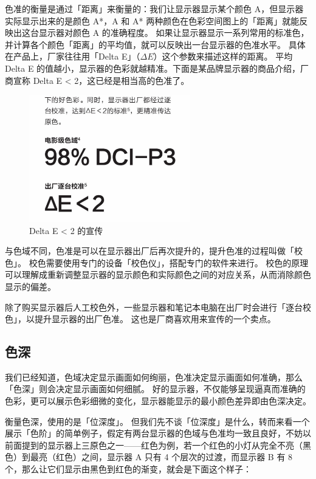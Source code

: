 色准的衡量是通过「距离」来衡量的：我们让显示器显示某个颜色 A，但显示器实际显示出来的是颜色 A*，A 和 A* 两种颜色在色彩空间图上的「距离」就能反映出这台显示器对颜色 A 的准确程度。
如果让显示器显示一系列常用的标准色，并计算各个颜色「距离」的平均值，就可以反映出一台显示器的色准水平。
具体在产品上，厂家往往用「Delta E」（$\Delta E$）这个参数来描述这样的距离。
平均 Delta E 的值越小，显示器的色彩就越精准。下面是某品牌显示器的商品介绍，厂商宣称 Delta E < 2，这已经是相当高的色准了。

\begin{figure}[htb!]
  \centering
  \includegraphics[width=7cm]{assets/Delta_E_below_2.jpg}
  \caption{Delta E < 2 的宣传}
  \label{Delta_E_below_2}
\end{figure}

与色域不同，色准是可以在显示器出厂后再次提升的，提升色准的过程叫做「校色」。
校色需要使用专门的设备「校色仪」，搭配专门的软件来进行。
校色的原理可以理解成重新调整显示器的显示颜色和实际颜色之间的对应关系，从而消除颜色显示的偏差。

除了购买显示器后人工校色外，一些显示器和笔记本电脑在出厂时会进行「逐台校色」，以提升显示器的出厂色准。
这也是厂商喜欢用来宣传的一个卖点。

\subsection{色深}

我们已经知道，色域决定显示画面如何绚丽，色准决定显示画面如何准确，那么「色深」则会决定显示画面如何细腻。
好的显示器，不仅能够呈现逼真而准确的色彩，更可以展示色彩细微的变化，显示器能显示的最小颜色差异即由色深决定。

衡量色深，使用的是「位深度」。
但我们先不谈「位深度」是什么，转而来看一个展示「色阶」的简单例子，假定有两台显示器的色域与色准均一致且良好，不妨以前面提到的显示器上三原色之一——红色为例，若一个红色的小灯从完全不亮（黑色）到最亮（红色）之间，显示器 A 只有 4 个层次的过渡，而显示器 B 有 8 个，那么让它们显示由黑色到红色的渐变，就会是下面这个样子：

